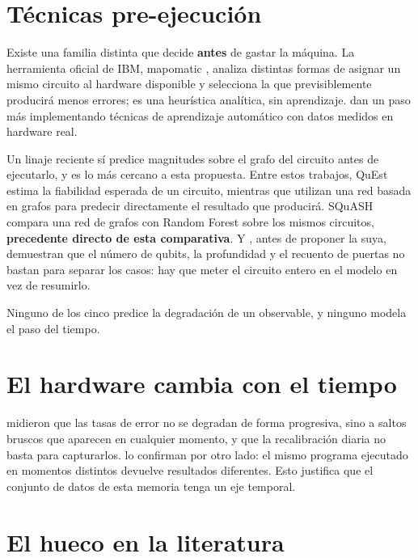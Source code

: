 \section{Técnicas pre-ejecución}
\label{sec:preejecucion}

Existe una familia distinta que decide \textbf{antes} de gastar la máquina. La herramienta
oficial de IBM, mapomatic \cite{nation2023suppressing}, analiza distintas formas de asignar un mismo circuito al hardware disponible y selecciona la que previsiblemente producirá menos errores; es una
heurística analítica, sin aprendizaje.  dan un paso más implementando técnicas de aprendizaje
automático con datos medidos en hardware real.

Un linaje reciente sí predice magnitudes sobre el grafo del circuito antes de ejecutarlo, y es
lo más cercano a esta propuesta. Entre estos trabajos, QuEst \cite{wang2025quest} estima la fiabilidad esperada de un circuito, mientras que  utilizan una red basada en grafos para predecir directamente el resultado que producirá.  
SQuASH \cite{martyniuk2025benchmarking} compara una red de grafos con Random Forest sobre los mismos circuitos, \textbf{precedente directo de esta comparativa}. Y , antes de
proponer la suya, demuestran que el número de qubits, la profundidad y el recuento de puertas no bastan para separar los casos: hay que meter el circuito entero en el modelo en vez
de resumirlo.

Ninguno de los cinco predice la degradación de un observable, y ninguno modela el paso del tiempo.

\section{El hardware cambia con el tiempo}
\label{sec:drift}

 midieron que las tasas de error no se degradan de forma progresiva,
sino a saltos bruscos que aparecen en cualquier momento, y que la recalibración diaria
no basta para capturarlos.  lo confirman por otro lado: el mismo
programa ejecutado en momentos distintos devuelve resultados diferentes. Esto 
justifica que el conjunto de datos de esta memoria tenga un eje temporal. 


\section{El hueco en la literatura}
\label{sec:gap}

